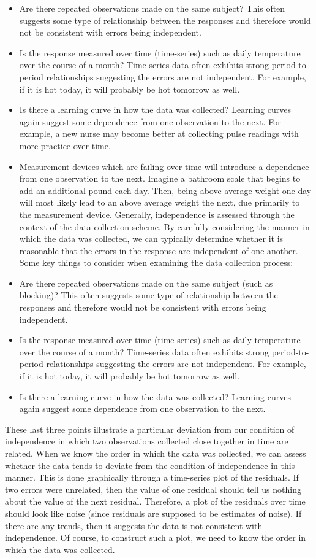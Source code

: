 \documentclass[
]{book}
\providecommand{\tightlist}{%
  \setlength{\itemsep}{0pt}\setlength{\parskip}{0pt}}
\theoremstyle{plain}
\theoremstyle{mydefn}
\theoremstyle{myexmpl}
\theoremstyle{remark}
\begin{document}
\begin{itemize}
\tightlist
\item
  Are there repeated observations made on the same subject? This often suggests some type of relationship between the responses and therefore would not be consistent with errors being independent.
\item
  Is the response measured over time (time-series) such as daily temperature over the course of a month? Time-series data often exhibits strong period-to-period relationships suggesting the errors are not independent. For example, if it is hot today, it will probably be hot tomorrow as well.
\item
  Is there a learning curve in how the data was collected? Learning curves again suggest some dependence from one observation to the next. For example, a new nurse may become better at collecting pulse readings with more practice over time.
\item
  Measurement devices which are failing over time will introduce a dependence from one observation to the next. Imagine a bathroom scale that begins to add an additional pound each day. Then, being above average weight one day will most likely lead to an above average weight the next, due primarily to the measurement device.
  Generally, independence is assessed through the context of the data collection scheme. By carefully considering the manner in which the data was collected, we can typically determine whether it is reasonable that the errors in the response are independent of one another. Some key things to consider when examining the data collection process:
\item
  Are there repeated observations made on the same subject (such as blocking)? This often suggests some type of relationship between the responses and therefore would not be consistent with errors being independent.
\item
  Is the response measured over time (time-series) such as daily temperature over the course of a month? Time-series data often exhibits strong period-to-period relationships suggesting the errors are not independent. For example, if it is hot today, it will probably be hot tomorrow as well.
\item
  Is there a learning curve in how the data was collected? Learning curves again suggest some dependence from one observation to the next.
\end{itemize}

These last three points illustrate a particular deviation from our condition of independence in which two observations collected close together in time are related. When we know the order in which the data was collected, we can assess whether the data tends to deviate from the condition of independence in this manner. This is done graphically through a time-series plot of the residuals. If two errors were unrelated, then the value of one residual should tell us nothing about the value of the next residual. Therefore, a plot of the residuals over time should look like noise (since residuals are supposed to be estimates of noise). If there are any trends, then it suggests the data is not consistent with independence. Of course, to construct such a plot, we need to know the order in which the data was collected.
\end{document}
